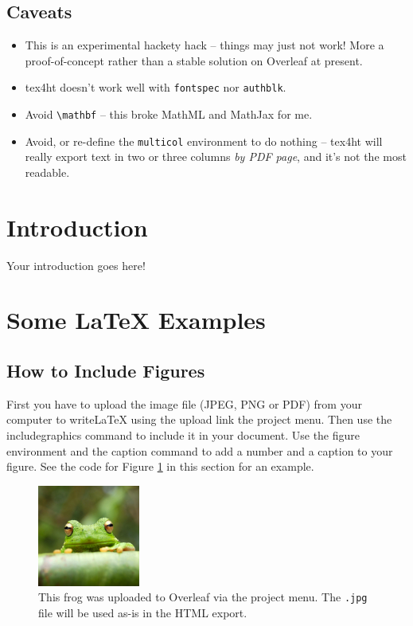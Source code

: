 \documentclass[a4paper,11pt]{article}
\begin{document}
\subsection{Caveats}

\begin{itemize}
\item This is an experimental hackety hack -- things may just not work! More a proof-of-concept rather than a stable solution on Overleaf at present.
\item tex4ht doesn't work well with \verb|fontspec| nor \verb|authblk|.
\item Avoid \verb|\mathbf| -- this broke MathML and MathJax for me.
\item Avoid, or re-define the \verb|multicol| environment to do nothing -- tex4ht will really export text in two or three columns \emph{by PDF page}, and it's not the most readable.
\end{itemize}

\section{Introduction}

Your introduction goes here! 

\section{Some \LaTeX{} Examples}
\label{sec:examples}

\subsection{How to Include Figures}

First you have to upload the image file (JPEG, PNG or PDF) from your computer to writeLaTeX using the upload link the project menu. Then use the includegraphics command to include it in your document. Use the figure environment and the caption command to add a number and a caption to your figure. See the code for Figure \ref{fig:frog} in this section for an example.

\begin{figure}
\centering
\includegraphics[width=0.3\textwidth]{frog}
\caption{\label{fig:frog}This frog was uploaded to Overleaf via the project menu. The \texttt{.jpg} file will be used as-is in the HTML export.}
\end{figure}
\end{document}
